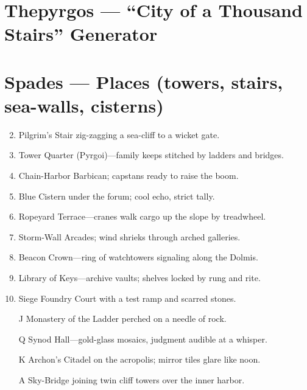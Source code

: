 \section{Thepyrgos --- ``City of a Thousand Stairs'' Generator}
\label{chap:thepyrgos}

\section*{Spades --- Places (towers, stairs, sea-walls, cisterns)}
\label{sec:thepyrgos-places}
\begin{enumerate}
\setcounter{enumi}{1}
\item Pilgrim's Stair zig-zagging a sea-cliff to a wicket gate.
\item Tower Quarter (Pyrgoi)---family keeps stitched by ladders and bridges.
\item Chain-Harbor Barbican; capstans ready to raise the boom.
\item Blue Cistern under the forum; cool echo, strict tally.
\item Ropeyard Terrace---cranes walk cargo up the slope by treadwheel.
\item Storm-Wall Arcades; wind shrieks through arched galleries.
\item Beacon Crown---ring of watchtowers signaling along the Dolmis.
\item Library of Keys---archive vaults; shelves locked by rung and rite.
\item Siege Foundry Court with a test ramp and scarred stones.
\item[J] Monastery of the Ladder perched on a needle of rock.
\item[Q] Synod Hall---gold-glass mosaics, judgment audible at a whisper.
\item[K] Archon's Citadel on the acropolis; mirror tiles glare like noon.
\item[A] Sky-Bridge joining twin cliff towers over the inner harbor.
\end{enumerate}

